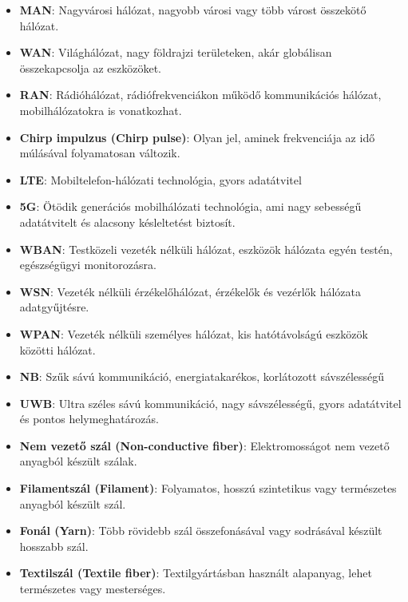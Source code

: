 \begin{itemize}
    \item \textbf{MAN}: Nagyvárosi hálózat, nagyobb városi vagy több várost összekötő hálózat.
    \item \textbf{WAN}: Világhálózat, nagy földrajzi területeken, akár globálisan összekapcsolja az eszközöket.
    \item \textbf{RAN}: Rádióhálózat, rádiófrekvenciákon működő kommunikációs hálózat, mobilhálózatokra is vonatkozhat.
    \item \textbf{Chirp impulzus (Chirp pulse)}: Olyan jel, aminek frekvenciája az idő múlásával folyamatosan változik.
    \item \textbf{LTE}: Mobiltelefon-hálózati technológia, gyors adatátvitel
    \item \textbf{5G}: Ötödik generációs mobilhálózati technológia, ami nagy sebességű adatátvitelt és alacsony késleltetést biztosít.
    \item \textbf{WBAN}: Testközeli vezeték nélküli hálózat, eszközök hálózata egyén testén, egészségügyi monitorozásra.
    \item \textbf{WSN}: Vezeték nélküli érzékelőhálózat, érzékelők és vezérlők hálózata adatgyűjtésre.
    \item \textbf{WPAN}: Vezeték nélküli személyes hálózat, kis hatótávolságú eszközök közötti hálózat.
    \item \textbf{NB}: Szűk sávú kommunikáció, energiatakarékos, korlátozott sávszélességű
    \item \textbf{UWB}: Ultra széles sávú kommunikáció, nagy sávszélességű, gyors adatátvitel és pontos helymeghatározás.
    \item \textbf{Nem vezető szál (Non-conductive fiber)}: Elektromosságot nem vezető anyagból készült szálak.
    \item \textbf{Filamentszál (Filament)}: Folyamatos, hosszú szintetikus vagy természetes anyagból készült szál.
    \item \textbf{Fonál (Yarn)}: Több rövidebb szál összefonásával vagy sodrásával készült hosszabb szál.
    \item \textbf{Textilszál (Textile fiber)}: Textilgyártásban használt alapanyag, lehet természetes vagy mesterséges.
\end{itemize}